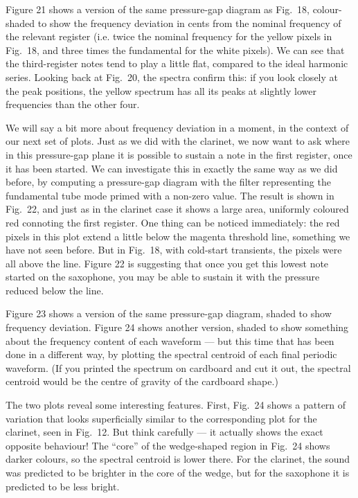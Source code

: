   Figure 21 shows a version of the same pressure-gap diagram as Fig.\ 18, 
  colour-shaded to show the frequency deviation in cents from the nominal 
  frequency of the relevant register (i.e. twice the nominal frequency for the 
  yellow pixels in Fig.\ 18, and three times the fundamental for the white 
  pixels). We can see that the third-register notes tend to play a little flat, 
  compared to the ideal harmonic series. Looking back at Fig.\ 20, the spectra 
  confirm this: if you look closely at the peak positions, the yellow spectrum 
  has all its peaks at slightly lower frequencies than the other four. 

  We will say a bit more about frequency deviation in a moment, in the context 
  of our next set of plots. Just as we did with the clarinet, we now want to 
  ask where in this pressure-gap plane it is possible to sustain a note in the 
  first register, once it has been started. We can investigate this in exactly 
  the same way as we did before, by computing a pressure-gap diagram with the 
  filter representing the fundamental tube mode primed with a non-zero value. 
  The result is shown in Fig.\ 22, and just as in the clarinet case it shows a 
  large area, uniformly coloured red connoting the first register. One thing 
  can be noticed immediately: the red pixels in this plot extend a little below 
  the magenta threshold line, something we have not seen before. But in Fig.\ 
  18, with cold-start transients, the pixels were all above the line. Figure 22 
  is suggesting that once you get this lowest note started on the saxophone, 
  you may be able to sustain it with the pressure reduced below the line. 

  Figure 23 shows a version of the same pressure-gap diagram, shaded to show 
  frequency deviation. Figure 24 shows another version, shaded to show 
  something about the frequency content of each waveform — but this time that 
  has been done in a different way, by plotting the spectral centroid of each 
  final periodic waveform. (If you printed the spectrum on cardboard and cut it 
  out, the spectral centroid would be the centre of gravity of the cardboard 
  shape.) 

  The two plots reveal some interesting features. First, Fig.\ 24 shows a 
  pattern of variation that looks superficially similar to the corresponding 
  plot for the clarinet, seen in Fig.\ 12. But think carefully — it actually 
  shows the exact opposite behaviour! The “core” of the wedge-shaped region in 
  Fig.\ 24 shows darker colours, so the spectral centroid is lower there. For 
  the clarinet, the sound was predicted to be brighter in the core of the 
  wedge, but for the saxophone it is predicted to be less bright. 

